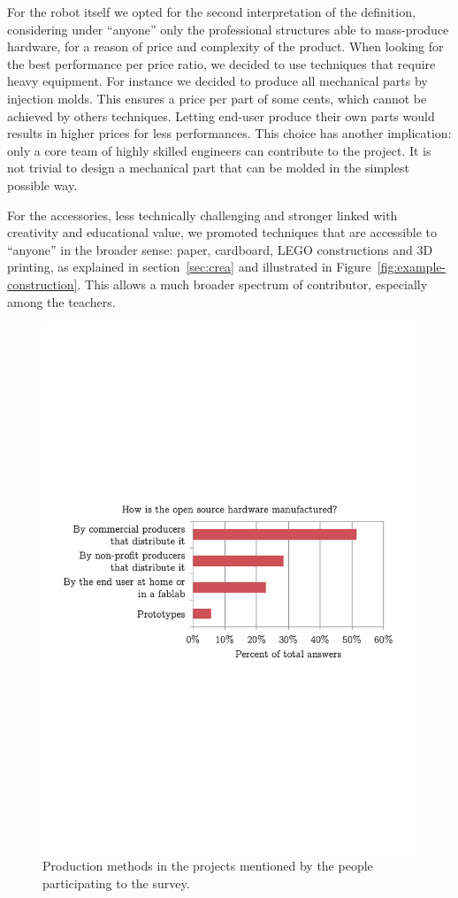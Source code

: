 \documentclass[letterpaper, 10 pt, conference]{ieeeconf}  %
\begin{document}
For the robot itself we opted for the second interpretation of the definition, considering under ``anyone'' only the professional structures able to mass-produce hardware, for a reason of price and complexity of the product. 
When looking for the best performance per price ratio, we decided to use techniques that require heavy equipment.
For instance we decided to produce all mechanical parts by injection molds. 
This ensures a price per part of some cents, which cannot be achieved by others techniques.
Letting end-user produce their own parts would results in higher prices for less performances. 
This choice has another implication: only a core team of highly skilled engineers can contribute to the project. 
It is not trivial to design a mechanical part that can be molded in the simplest possible way.

For the accessories, less technically challenging and stronger linked with creativity and educational value, we promoted techniques that are accessible to ``anyone'' in the broader sense: paper, cardboard, LEGO constructions and 3D printing, as explained in section~\ref{sec:crea} and illustrated in Figure~\ref{fig:example-construction}.
This allows a much broader spectrum of contributor, especially among the teachers.


\begin{figure}
\centering
\includegraphics[width=\columnwidth]{figures/manufacturing}
\caption{Production methods in the projects mentioned by the people participating to the survey.}
\label{fig:production}
\end{figure}
\end{document}
